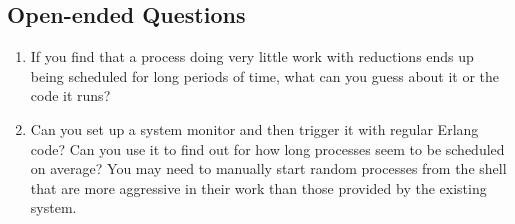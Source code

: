 \documentclass[11pt, oneside]{book}   	%
\begin{document}
\subsection{Open-ended Questions}

\begin{enumerate}
	\item If you find that a process doing very little work with reductions ends up being scheduled for long periods of time, what can you guess about it or the code it runs?
	\item Can you set up a system monitor and then trigger it with regular Erlang code? Can you use it to find out for how long processes seem to be scheduled on average? You may need to manually start random processes from the shell that are more aggressive in their work than those provided by the existing system.
\end{enumerate}


\end{document}
